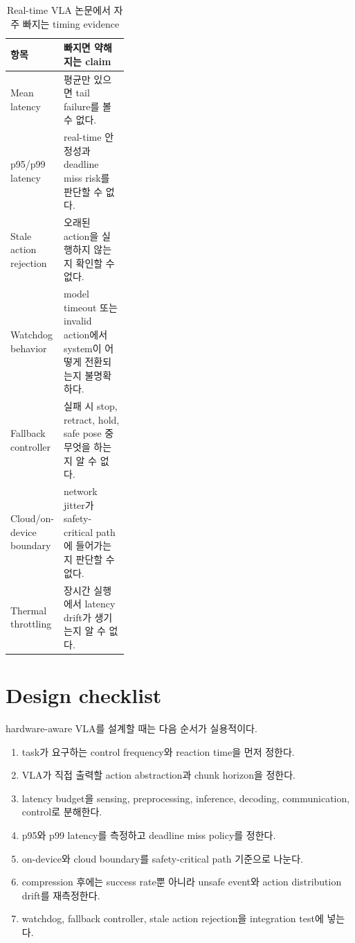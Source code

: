 \begin{table}[h]
  \centering
  \small
  \caption{Real-time VLA 논문에서 자주 빠지는 timing evidence}
  \begin{tabularx}{\linewidth}{@{}p{0.34\linewidth}X@{}}
    \toprule
    항목 & 빠지면 약해지는 claim \\
    \midrule
    Mean latency & 평균만 있으면 tail failure를 볼 수 없다. \\
    p95/p99 latency & real-time 안정성과 deadline miss risk를 판단할 수 없다. \\
    Stale action rejection & 오래된 action을 실행하지 않는지 확인할 수 없다. \\
    Watchdog behavior & model timeout 또는 invalid action에서 system이 어떻게 전환되는지 불명확하다. \\
    Fallback controller & 실패 시 stop, retract, hold, safe pose 중 무엇을 하는지 알 수 없다. \\
    Cloud/on-device boundary & network jitter가 safety-critical path에 들어가는지 판단할 수 없다. \\
    Thermal throttling & 장시간 실행에서 latency drift가 생기는지 알 수 없다. \\
    \bottomrule
  \end{tabularx}
  \label{tab:ch18-missing-timing-evidence}
\end{table}

\section{Design checklist}

hardware-aware VLA를 설계할 때는 다음 순서가 실용적이다.
\begin{enumerate}
  \item task가 요구하는 control frequency와 reaction time을 먼저 정한다.
  \item VLA가 직접 출력할 action abstraction과 chunk horizon을 정한다.
  \item latency budget을 sensing, preprocessing, inference, decoding, communication, control로 분해한다.
  \item p95와 p99 latency를 측정하고 deadline miss policy를 정한다.
  \item on-device와 cloud boundary를 safety-critical path 기준으로 나눈다.
  \item compression 후에는 success rate뿐 아니라 unsafe event와 action distribution drift를 재측정한다.
  \item watchdog, fallback controller, stale action rejection을 integration test에 넣는다.
\end{enumerate}

